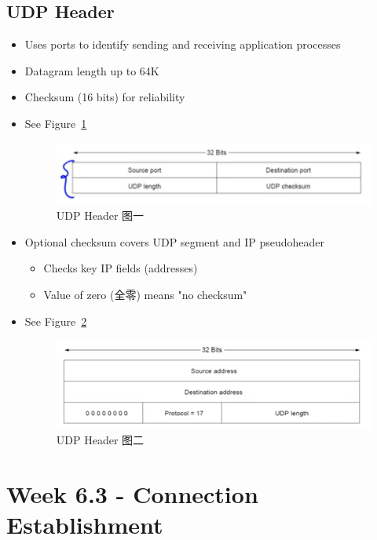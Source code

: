 \documentclass[12pt]{ctexart}   %
\begin{document}
	\subsection{UDP Header}
	\begin{itemize}
		\item Uses ports to identify sending and receiving application processes
		\item Datagram length up to 64K
		\item Checksum (16 bits) for reliability
		\item See Figure~\ref{fig:6-2-4}
		 
		 \begin{figure}[h!] %
		\centering
		 \includegraphics[scale=0.7]{images/6-2-4}
		\caption{ UDP Header 图一 }
		 \label{fig:6-2-4}
		 \end{figure}
		 
		 \item Optional checksum covers UDP segment and IP pseudoheader
		 \begin{itemize}
		 	\item Checks key IP fields (addresses)
		 	\item Value of zero (全零) means "no checksum"
		 \end{itemize}
		 \item See Figure~\ref{fig:6-2-5}
		 
		 \begin{figure}[h!] %
		\centering
		 \includegraphics[scale=0.7]{images/6-2-5}
		\caption{ UDP Header 图二 }
		 \label{fig:6-2-5}
		 \end{figure}

	\end{itemize}
	
\section{ Week 6.3 - Connection Establishment }	
\end{document}
